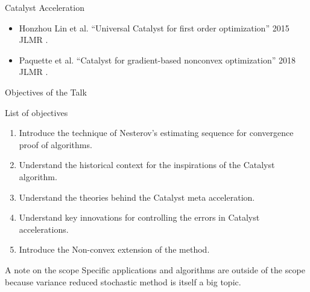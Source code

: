 \documentclass[11pt]{beamer}
\begin{document}
        \begin{frame}{Catalyst Acceleration}
            \begin{figure}
                \centering
            \end{figure}
            \begin{itemize}
                \item Honzhou Lin et al. ``Universal Catalyst for first order optimization'' 2015 JLMR \cite{lin_universal_2015}.
                \item Paquette et al. ``Catalyst for gradient-based nonconvex optimization'' 2018 JLMR \cite{paquette_catalyst_2018}. 
            \end{itemize}
        \end{frame}
        \begin{frame}{Objectives of the Talk}
            \begin{block}{List of objectives}
                \begin{enumerate}
                    \item Introduce the technique of Nesterov's estimating sequence for convergence proof of algorithms. 
                    \item Understand the historical context for the inspirations of the Catalyst algorithm.  
                    \item Understand the theories behind the Catalyst meta acceleration. 
                    \item Understand key innovations for controlling the errors in Catalyst accelerations. 
                    \item Introduce the Non-convex extension of the method. 
                \end{enumerate}
            \end{block}
            \pause
            \begin{block}{A note on the scope}
                Specific applications and algorithms are outside of the scope because variance reduced stochastic method is itself a big topic.     
            \end{block}
        \end{frame}
\end{document}
